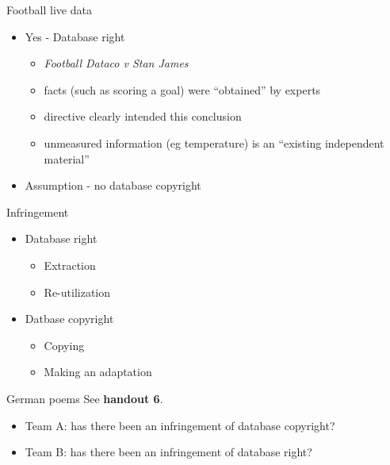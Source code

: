 \documentclass[aspectratio=169]{beamer}
\begin{document}
  \begin{frame}{Football live data}
    \begin{itemize}
    \item Yes - Database right
      \begin{itemize}
      \item \protect\textit{Football Dataco v Stan James}
      \item facts (such as scoring a goal) were ``obtained'' by experts
      \item directive clearly intended this conclusion
      \item unmeasured information (eg temperature) is an ``existing independent material''
      \end{itemize}
    \item Assumption - no database copyright
    \end{itemize}
  \end{frame}

  \begin{frame}{Infringement}
    \begin{itemize}
    \item Database right
      \begin{itemize}
      \item Extraction
      \item Re-utilization
      \end{itemize}
    \item Datbase copyright
      \begin{itemize}
      \item Copying
      \item Making an adaptation
      \end{itemize}
    \end{itemize}
  \end{frame}

  \begin{frame}{German poems}
    See {\bf handout 6}.
    \begin{itemize}
    \item Team A: has there been an infringement of database copyright?
    \item Team B: has there been an infringement of database right?
    \end{itemize}
    
  \end{frame}
\end{document}
